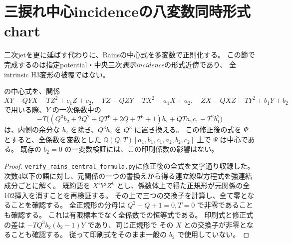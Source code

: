 \section{三捩れ中心incidenceの八変数同時形式chart}
\label{sec:multivariate-formal-chart}
二次jetを更に延ばす代わりに、Rainsの中心式を多変数で正則化する。
この節で完成するのは指定potential・中央三次\emph{表示incidence}の形式近傍であり、
全intrinsic H3変形の被覆ではない。

\begin{lemma}[Rains式の印刷係数と独立検証]\label{lem:rains-corrected}
\cite[Appendix9.1, p.35]{EG}の中心式を、関係
\[
 XY-QYX-TZ^2+c_1Z+c_2,\quad
 YZ-QZY-TX^2+a_1X+a_2,\quad
 ZX-QXZ-TY^2+b_1Y+b_2
\]
で用いる際、$Y$ の一次係数中の
\[
 -T\bigl((Q^3b_2+2Q^2+QT^3+2Q+T^3+1)b_2
               +QT a_1c_1-T^2b_1^2\bigr)
\]
は、内側の余分な $b_2$ を除き、$Q^3b_2$ を $Q^3$ に置き換える。
この修正後の式を $\Psi$ とすると、全係数を変数とした
$\mathbb Q(Q,T)[a_1,b_1,c_1,a_2,b_2,c_2]$ 上で $\Psi$ は中心である。
既存の $b_2=0$ の一変数検証には、この印刷係数の影響はない。
\end{lemma}
\begin{proof}
\texttt{verify\_rains\_central\_formula.py}に修正後の全式を文字通り収録した。
次数4以下の語に対し、元関係の一つの書換えから得る連立線型方程式を強連結成分ごとに解く。
既約語を $X^iY^jZ^k$ とし、係数体上で得た正規形が元関係の全102挿入を消すことを再検証する。
その上で三つの交換子を計算し、全て零となることを確認する。
全正規形の分母は $Q^2+Q+1=0,T=0$ で非零であることも確認する。
これは有限標本でなく全係数での恒等式である。
印刷式と修正式の差は $-TQ^3b_2(b_2-1)Y$ であり、同じ正規形で
その $X$ との交換子が非零となることも確認する。
従って印刷式をそのまま一般の $b_2$ で使用していない。
\end{proof}

